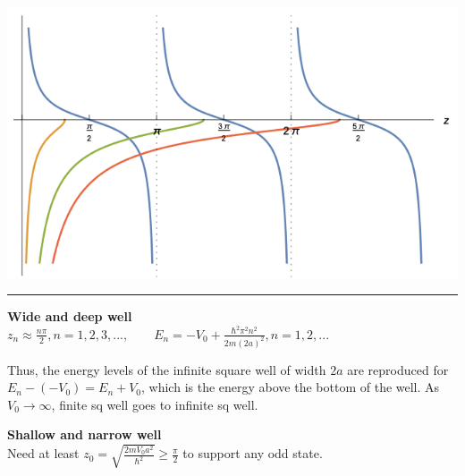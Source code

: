 \vspace{-8em}
\begin{Figure}
    \raggedleft
    \includegraphics[width=0.4\columnwidth]{figures/odd_finite_square_well.png}
\end{Figure}
\vspace{-1em}

\medskip
\hrule height 0.3pt \thinspace

\textbf{Wide and deep well} \\

$z_n \approx \frac{n \pi}{2}, n = 1, 2, 3, ..., \qquad E_n = -V_0 + \frac{\hbar^2 \pi^2 n^2}{2m(2a)^2}, n = 1, 2, ...$

Thus, the energy levels of the infinite square well of width $2a$ are reproduced for $E_n - (-V_0) = E_n + V_0$, which is the energy above the bottom of the well. As $V_0 \rightarrow \infty$, finite sq well goes to infinite sq well.




\textbf{Shallow and narrow well} \\
Need at least $z_0 = \sqrt{\frac{2mV_0 a^2}{\hbar^2}} \geq \frac{\pi}{2}$ to support any odd state.


